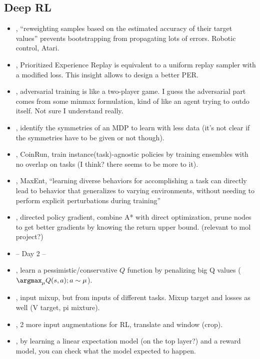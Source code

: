 \subsection{Deep RL}
\begin{itemize}
\item \citet{kumar2020discor}, ``reweighting samples based on the estimated accuracy of their target values'' prevents bootstrapping from propagating lots of errors. Robotic control, Atari.
\item \citet{fujimoto2020equivalence}, Prioritized Experience Replay is equivalent to a uniform replay sampler with a modified loss. This insight allows to design a better PER.
\item \citet{kamalaruban2020robust}, adversarial training is like a two-player game. I guess the adversarial part comes from some minmax formulation, kind of like an agent trying to outdo itself. Not sure I understand really.
\item \citet{van2020mdp}, identify the symmetries of an MDP to learn with less data (it's not clear if the symmetries have to be given or not though).
\item \citet{bertran2020instance}, CoinRun, train instance(task)-agnostic policies by training ensembles with no overlap on tasks (I think? there seems to be more to it).
\item \citet{kumar2020one}, MaxEnt, ``learning diverse behaviors for accomplishing a task can directly lead to behavior that generalizes to varying environments, without needing to perform explicit perturbations during training''
\item \citet{lorberbom2020direct}, directed policy gradient, combine A* with direct optimization, prune nodes to get better gradients by knowing the return upper bound. (relevant to mol project?)
\item -- Day 2 --
\item \citet{kumar2020conservative}, learn a pessimistic/conservative $Q$ function by penalizing big Q values ($\argmax_\mu Q(s,a); a \sim \mu$).
\item \citet{wang2020improving}, input mixup, but from inputs of different tasks. Mixup target and losses as well (V target, pi mixture).
\item \citet{laskin2020reinforcement}, 2 more input augmentations for RL, translate and window (crop).
\item \citet{yau2020did}, by learning a linear expectation model (on the top layer?) and a reward model, you can check what the model expected to happen.

\end{itemize}
